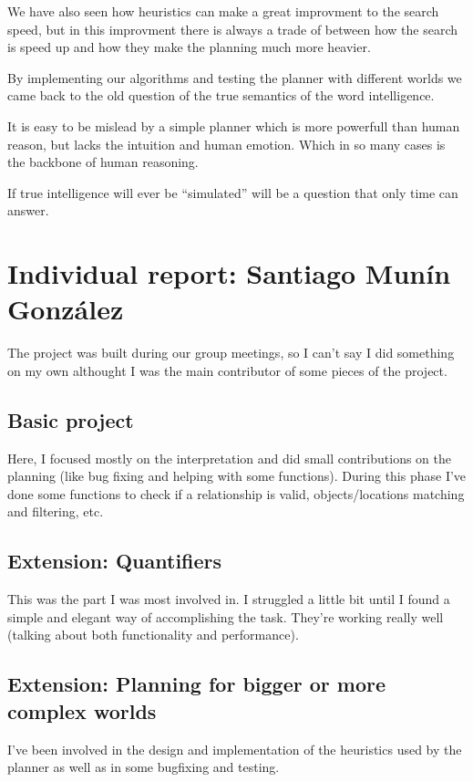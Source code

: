 \documentclass[11pt]{article}
\begin{document}
We have also seen how heuristics can make a great improvment to the search 
speed, but in this improvment there is always a trade of between how 
the search is speed up and how they make the planning much more heavier.  

By implementing our algorithms and testing the planner with different worlds 
we came back to the old question of the true semantics of the word 
intelligence. 

It is easy to be mislead by a simple planner which is more powerfull 
than human reason, but lacks the intuition and human emotion. Which in so many 
cases is the backbone of human reasoning.    

If true intelligence will ever be ``simulated'' will be a question that only 
time can answer.  
\newpage
\appendix
\section{Individual report: Santiago Munín González}
The project was built during our group meetings, so I can't say I did something on my own althought I 
was the main contributor of some pieces of the project.

\subsection{Basic project}

Here, I focused mostly on the interpretation and did small contributions on the planning (like bug fixing and 
helping with some functions). During this phase I've done some functions to check if a relationship is valid, 
objects/locations matching and filtering, etc.

\subsection{Extension: Quantifiers}

This was the part I was most involved in. I struggled a little 
bit until I found a simple and elegant way of accomplishing the task. They're working really well (talking about both functionality and performance).

\subsection{Extension: Planning for bigger or more complex worlds}

I've been involved in the design and implementation of the heuristics used by the planner as well as in some 
bugfixing and testing.
\end{document}
